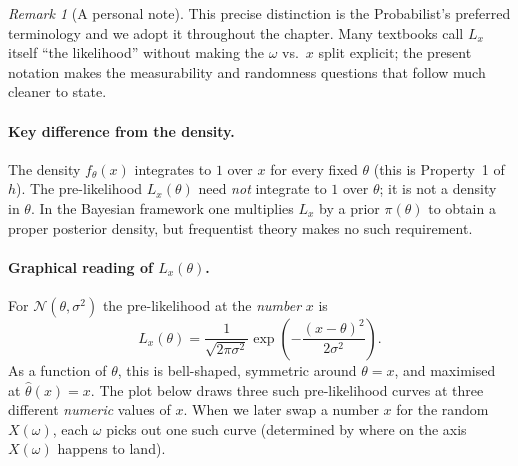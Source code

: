 \documentclass[a4paper,oneside,12pt]{extarticle}
\theoremstyle{plain}
\theoremstyle{definition}
\theoremstyle{remark}
\newtheorem{remark}[proposition]{Remark}
\begin{document}
\begin{remark}[A personal note]
This precise distinction is the Probabilist's preferred terminology and we adopt
it throughout the chapter.  Many textbooks call $L_x$ itself ``the
likelihood'' without making the $\omega$ vs.\ $x$ split explicit;
the present notation makes the measurability and randomness questions
that follow much cleaner to state.
\end{remark}

\paragraph{Key difference from the density.}
The density $f_\theta(x)$ integrates to $1$ over $x$ for every fixed
$\theta$ (this is Property~1 of $h$).  The pre-likelihood
$L_x(\theta)$ need \emph{not} integrate to $1$ over $\theta$;
it is not a density in $\theta$.  In the Bayesian framework one
multiplies $L_x$ by a prior $\pi(\theta)$ to obtain a proper
posterior density, but frequentist theory makes no such requirement.

\paragraph{Graphical reading of $L_x(\theta)$.}
For $\mathcal{N}(\theta, \sigma^2)$ the pre-likelihood at the
\emph{number} $x$ is
\[
  L_x(\theta) = \frac{1}{\sqrt{2\pi\sigma^2}}\exp\!\left(-\frac{(x-\theta)^2}{2\sigma^2}\right).
\]
As a function of $\theta$, this is bell-shaped, symmetric around
$\theta = x$, and maximised at $\hat\theta(x) = x$.  The plot below
draws three such pre-likelihood curves at three different
\emph{numeric} values of $x$.  When we later swap a number $x$ for
the random $X(\omega)$, each $\omega$ picks out one such curve
(determined by where on the axis $X(\omega)$ happens to land).

\begin{center}
\end{center}
\end{document}
